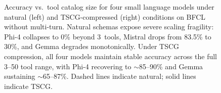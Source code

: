 \begin{figure}[t]
\caption{Accuracy vs.\ tool catalog size for four small language models under natural (left) and TSCG-compressed (right) conditions on BFCL without multi-turn. Natural schemas expose severe scaling fragility: Phi-4 collapses to 0\% beyond 3~tools, Mistral drops from 83.5\% to 30\%, and Gemma degrades monotonically. Under TSCG compression, all four models maintain stable accuracy across the full 3--50 tool range, with Phi-4 recovering to ${\sim}$85--90\% and Gemma sustaining ${\sim}$65--87\%. Dashed lines indicate natural; solid lines indicate TSCG.}
\label{fig:scaling}
\end{figure}
